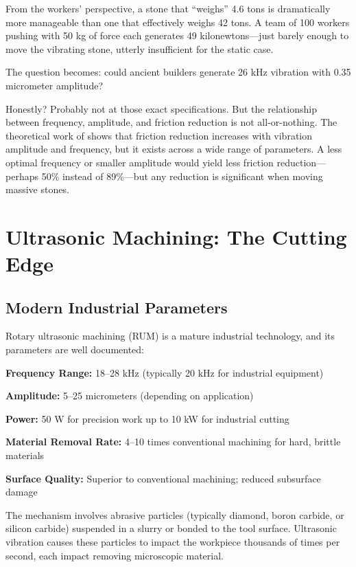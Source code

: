 \documentclass[11pt]{article}
\begin{document}
From the workers' perspective, a stone that ``weighs'' 4.6 tons is dramatically more manageable than one that effectively weighs 42 tons. A team of 100 workers pushing with 50 kg of force each generates 49 kilonewtons---just barely enough to move the vibrating stone, utterly insufficient for the static case.

The question becomes: could ancient builders generate 26 kHz vibration with 0.35 micrometer amplitude?

Honestly? Probably not at those exact specifications. But the relationship between frequency, amplitude, and friction reduction is not all-or-nothing. The theoretical work of \citet{Popov2020} shows that friction reduction increases with vibration amplitude and frequency, but it exists across a wide range of parameters. A less optimal frequency or smaller amplitude would yield less friction reduction---perhaps 50\% instead of 89\%---but any reduction is significant when moving massive stones.

\section{Ultrasonic Machining: The Cutting Edge}

\subsection{Modern Industrial Parameters}

Rotary ultrasonic machining (RUM) is a mature industrial technology, and its parameters are well documented:

\textbf{Frequency Range:} 18--28 kHz (typically 20 kHz for industrial equipment)

\textbf{Amplitude:} 5--25 micrometers (depending on application)

\textbf{Power:} 50 W for precision work up to 10 kW for industrial cutting

\textbf{Material Removal Rate:} 4--10 times conventional machining for hard, brittle materials

\textbf{Surface Quality:} Superior to conventional machining; reduced subsurface damage

The mechanism involves abrasive particles (typically diamond, boron carbide, or silicon carbide) suspended in a slurry or bonded to the tool surface. Ultrasonic vibration causes these particles to impact the workpiece thousands of times per second, each impact removing microscopic material.
\end{document}
